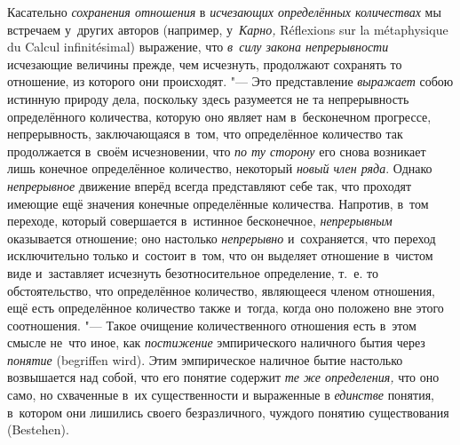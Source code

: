 Касательно {\em сохранения отношения} в
{\em исчезающих определённых количествах} мы
встречаем у~других авторов (например, у~{\em Карно,}
Ré\-flexi\-ons sur la méta\-phy\-sique du Cal\-cul in\-fini\-tési\-mal)
выражение, что {\em в~силу закона непрерывности} исчезающие величины прежде,
чем исчезнуть, продолжают сохранять то отношение, из которого они происходят.
"--- Это представление {\em выражает} собою истинную природу дела, поскольку
здесь разумеется не та непрерывность определённого количества, которую оно
являет нам в~бесконечном прогрессе, непрерывность, заключающаяся в~том, что
определённое количество так продолжается в~своём исчезновении, что
{\em по ту сторону} его снова возникает лишь конечное определённое
количество, некоторый {\em новый член ряда}. Однако {\em непрерывное} движение
вперёд всегда представляют себе так, что проходят имеющие ещё значения
конечные определённые количества. Напротив, в~том переходе, который совершается
в~истинное бесконечное, {\em непрерывным} оказывается отношение; оно настолько
{\em непрерывно} и~сохраняется, что переход исключительно только и~состоит
в~том, что он выделяет отношение в~чистом виде и~заставляет исчезнуть
безотносительное определение, т.~е. то обстоятельство, что определённое
количество, являющееся членом отношения, ещё есть определённое количество также
и~тогда, когда оно положено вне этого соотношения. "--- Такое очищение
количественного отношения есть в~этом смысле не~что иное, как
{\em постижение} эмпирического наличного бытия через
{\em понятие} (be\-grif\-fen wird). Этим эмпирическое наличное бытие
настолько возвышается над собой, что его понятие содержит
{\em те же определения,} что оно само, но схваченные в~их существенности и
выраженные в {\em единстве} понятия, в~котором они лишились своего безразличного,
чуждого понятию существования (Bestehen).

